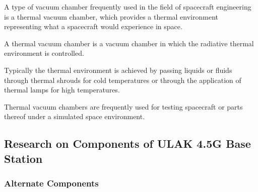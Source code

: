 A type of vacuum chamber frequently used in the field of spacecraft engineering is a thermal vacuum chamber, which provides a thermal environment representing what a spacecraft would experience in space.

	A thermal vacuum chamber is a vacuum chamber in which the radiative thermal environment is controlled.

Typically the thermal environment is achieved by passing liquids or fluids through thermal shrouds for cold temperatures or through the application of thermal lamps for high temperatures.

Thermal vacuum chambers are frequently used for testing spacecraft or parts thereof under a simulated space environment.

\subsection{Research on Components of ULAK 4.5G Base Station  }

\subsubsection{Alternate Components}

\- \vfill

								
	
 
%      
	
